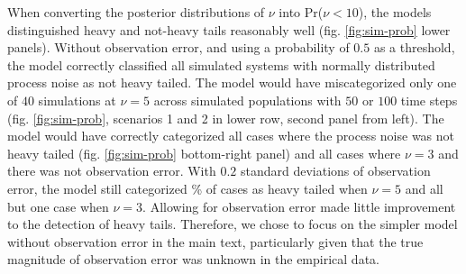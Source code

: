 \documentclass[12pt]{article}
\begin{document}
When converting the posterior distributions of $\nu$ into Pr($\nu < 10$), the models distinguished heavy and not-heavy tails reasonably well (fig. \ref{fig:sim-prob} lower panels). Without observation error, and using a probability of $0.5$ as a threshold, the model correctly classified all simulated systems with normally distributed process noise as not heavy tailed.  The model would have miscategorized only one of $40$ simulations at $\nu = 5$ across simulated populations with $50$ or $100$ time steps (fig. \ref{fig:sim-prob}, scenarios 1 and 2 in lower row, second panel from left).  The model would have correctly categorized all cases where the process noise was not heavy tailed (fig. \ref{fig:sim-prob} bottom-right panel) and all cases where $\nu = 3$ and there was not observation error. With $0.2$ standard deviations of observation error, the model still categorized \obsErrorNuFivePerc\% of cases as heavy tailed when $\nu = 5$ and all but one case when $\nu = 3$. Allowing for observation error made little improvement to the detection of heavy tails. Therefore, we chose to focus on the simpler model without observation error in the main text, particularly given that the true magnitude of observation error was unknown in the empirical data.
\end{document}
